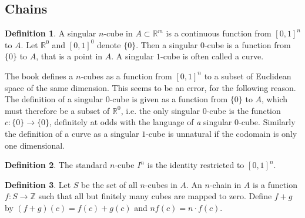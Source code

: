 \documentclass[20pt]{article}
\theoremstyle{plain}
\theoremstyle{definition}
\newtheorem{definition}{Definition}
\newcommand{\reals}{\mathbb{R}}
\newcommand{\integers}{\mathbb{Z}}
\begin{document}
 



 



 



 



 



 



 



 



 



 



 



 



 

\subsection{Chains}

\begin{definition}
   A singular $n$-cube in $A \subset \reals^m$ is a continuous function from 
   $[0,1]^n$ to $A$.  Let $\reals^0$ and $[0,1]^0$ denote $\{0\}$.
   Then a singular $0$-cube is a function from $\{0\}$ to $A$, that is a point 
   in $A$.
   A singular $1$-cube is often called a curve.
\end{definition}
\color{Blue}
The book defines a $n$-cubes as a function from $[0, 1]^n$ to a subset of 
Euclidean space of the same dimension.  This seems to be an error, for the following reason.
The definition of a singular $0$-cube is given as a function from $\{0\}$ to $A$, which 
must therefore be a subset of $\reals^0$, i.e. the only 
singular $0$-cube is the function $c: \{0\} \to \{0\}$, definitely at odds with the 
language of \textit{a} singular $0$-cube.
Similarly the definition of a curve as a singular $1$-cube is unnatural if 
the codomain is only one dimensional.
\color{Black}

\begin{definition}
  The standard $n$-cube $I^n$ is the identity restricted to $[0, 1]^n$.
\end{definition}

\begin{definition}
  Let $S$ be the set of all $n$-cubes in $A$.  An $n$-chain in $A$ is a function
  $f: S \to \integers$ such that all but finitely many cubes are mapped to zero.
  Define $f + g$ by $(f+g)(c) = f(c) + g(c)$ and $nf(c) = n \cdot f(c)$.
\end{definition}
\end{document}
